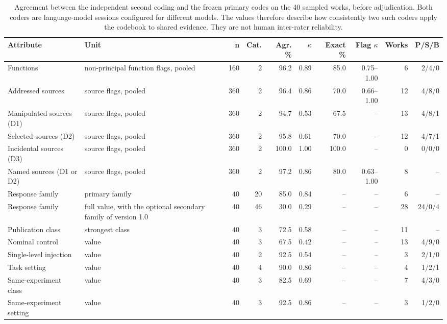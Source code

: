 \begin{table}[!t]
\centering
\caption{Agreement between the independent second coding and the frozen primary codes on the 40 sampled works, before adjudication. Both coders are language-model sessions configured for different models. The values therefore describe how consistently two such coders apply the codebook to shared evidence. They are not human inter-rater reliability.}
\label{tab:agreement}
\surveytableformat
\setlength{\tabcolsep}{3pt}
\begin{tabularx}{\linewidth}{@{}L{2.9cm}Yrrrrrrrr@{}}
\toprule
\textbf{Attribute} & \textbf{Unit} & \textbf{n} & \textbf{Cat.} & \textbf{Agr. \%} & \textbf{$\kappa$} & \textbf{Exact \%} & \textbf{Flag $\kappa$} & \textbf{Works} & \textbf{P/S/B} \\
\midrule
Functions & non-principal function flags, pooled & 160 & 2 & 96.2 & 0.89 & 85.0 & 0.75--1.00 & 6 & 2/4/0 \\
Addressed sources & source flags, pooled & 360 & 2 & 96.4 & 0.86 & 70.0 & 0.66--1.00 & 12 & 4/8/0 \\
Manipulated sources (D1) & source flags, pooled & 360 & 2 & 94.7 & 0.53 & 67.5 & -- & 13 & 4/8/1 \\
Selected sources (D2) & source flags, pooled & 360 & 2 & 95.8 & 0.61 & 70.0 & -- & 12 & 4/7/1 \\
Incidental sources (D3) & source flags, pooled & 360 & 2 & 100.0 & 1.00 & 100.0 & -- & 0 & 0/0/0 \\
Named sources (D1 or D2) & source flags, pooled & 360 & 2 & 97.2 & 0.86 & 80.0 & 0.63--1.00 & 8 & -- \\
Response family & primary family & 40 & 20 & 85.0 & 0.84 & -- & -- & 6 & -- \\
Response family & full value, with the optional secondary family of version 1.0 & 40 & 46 & 30.0 & 0.29 & -- & -- & 28 & 24/0/4 \\
Publication class & strongest class & 40 & 3 & 72.5 & 0.58 & -- & -- & 11 & -- \\
Nominal control & value & 40 & 3 & 67.5 & 0.42 & -- & -- & 13 & 4/9/0 \\
Single-level injection & value & 40 & 2 & 92.5 & 0.54 & -- & -- & 3 & 2/1/0 \\
Task setting & value & 40 & 4 & 90.0 & 0.86 & -- & -- & 4 & 1/2/1 \\
Same-experiment class & value & 40 & 3 & 82.5 & 0.69 & -- & -- & 7 & 4/3/0 \\
Same-experiment setting & value & 40 & 3 & 92.5 & 0.86 & -- & -- & 3 & 1/2/0 \\

\end{tabularx}
\end{table}
